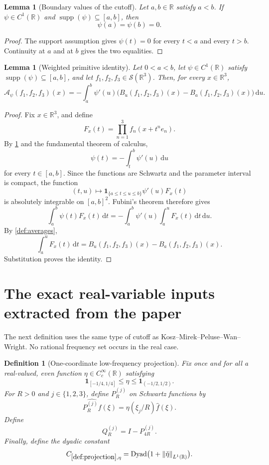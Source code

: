 \documentclass[11pt]{article}
\newtheorem{lemma}[theorem]{Lemma}
\newtheorem{definition}[theorem]{Definition}
\newcommand{\R}{\mathbb{R}}
\newcommand{\Sch}{\mathcal{S}}
\newcommand{\supp}{\operatorname{supp}}
\newcommand{\Dyad}{\operatorname{Dyad}}
\newcommand{\A}{\mathcal{A}}
\newcommand{\dd}{\,\mathrm{d}}
\newcommand{\one}{\mathbf{1}}
\newcommand{\norm}[2]{\left\lVert #1\right\rVert_{#2}}
\newcommand{\Cst}[2]{C_{\ref{#1},#2}}
\newcommand{\indices}{\{1,2,3\}}
\begin{document}
\begin{lemma}[Boundary values of the cutoff]\label{lem:cutoff-boundary}
Let \(a,b\in\R\) satisfy \(a<b\).  If \(\psi\in C^1(\R)\) and \(\supp(\psi)\subseteq[a,b]\), then
\[
\psi(a)=\psi(b)=0.
\]
\end{lemma}

\begin{proof}
The support assumption gives \(\psi(t)=0\) for every \(t<a\) and every \(t>b\).  Continuity at \(a\) and at \(b\) gives the two equalities.
\end{proof}

\begin{lemma}[Weighted primitive identity]\label{lem:weighted-primitive-identity}
Let \(0<a<b\), let \(\psi\in C^1(\R)\) satisfy \(\supp(\psi)\subseteq[a,b]\), and let \(f_1,f_2,f_3\in\Sch(\R^3)\).  Then, for every \(x\in\R^3\),
\[
\A_\psi(f_1,f_2,f_3)(x)
=
-\int_a^b\psi'(u)\bigl(B_u(f_1,f_2,f_3)(x)-B_a(f_1,f_2,f_3)(x)\bigr)\dd u.
\]
\end{lemma}

\begin{proof}
Fix \(x\in\R^3\), and define
\[
F_x(t)=\prod_{n=1}^{3}f_n(x+t^n e_n).
\]
By \cref{lem:cutoff-boundary} and the fundamental theorem of calculus,
\[
\psi(t)=-\int_t^b\psi'(u)\dd u
\]
for every \(t\in[a,b]\).  Since the functions are Schwartz and the parameter interval is compact, the function
\[
(t,u)\longmapsto\one_{\{a\leq t\leq u\leq b\}}\psi'(u)F_x(t)
\]
is absolutely integrable on \([a,b]^2\).  Fubini's theorem therefore gives
\[
\int_a^b\psi(t)F_x(t)\dd t
=
-\int_a^b\psi'(u)\int_a^uF_x(t)\dd t\dd u.
\]
By \cref{def:averages},
\[
\int_a^uF_x(t)\dd t=B_u(f_1,f_2,f_3)(x)-B_a(f_1,f_2,f_3)(x).
\]
Substitution proves the identity.
\end{proof}

\section{The exact real-variable inputs extracted from the paper}

The next definition uses the same type of cutoff as Kosz--Mirek--Peluse--Wan--Wright.  No rational frequency set occurs in the real case.

\begin{definition}[One-coordinate low-frequency projection]\label{def:projection}
Fix once and for all a real-valued, even function \(\eta\in C_c^\infty(\R)\) satisfying
\[
\one_{[-1/4,1/4]}\leq\eta\leq\one_{(-1/2,1/2)}.
\]
For \(R>0\) and \(j\in\indices\), define \(P_R^{(j)}\) on Schwartz functions by
\[
\widehat{P_R^{(j)}f}(\xi)=\eta(\xi_j/R)\widehat f(\xi).
\]
Define
\[
Q_R^{(j)}=I-P_{4R}^{(j)}.
\]
Finally, define the dyadic constant
\[
\Cst{def:projection}{\eta}=\Dyad\bigl(1+\norm{\check\eta}{L^1(\R)}\bigr).
\]
\end{definition}
\end{document}
